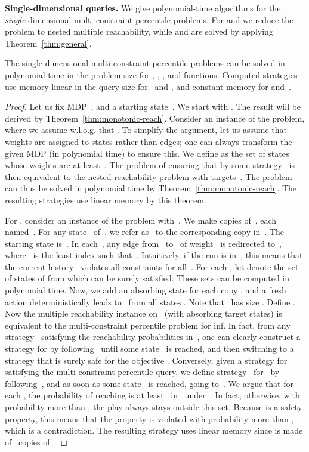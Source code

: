\documentclass{llncs}
\begin{document}
\smallskip\noindent\textbf{Single-dimensional queries.} We give polynomial-time algorithms for the \emph{single}-dimensional multi-cons\-traint percentile problems.
For  and  we reduce the problem to nested multiple reachability, while  and  are solved by applying Theorem~\ref{thm:general}. 

\begin{theorem}
\label{thm:quant_reg_single_dim}
  The single-dimensional multi-constraint percentile problems can be solved in polynomial time in the problem size
  for , , , and  functions. Computed strategies use memory linear in the query size for~ and ,
  and constant memory for  and~.
\end{theorem}
\begin{proof}
  Let us fix MDP~, and a starting state~. We start with . The result will be derived by Theorem~\ref{thm:monotonic-reach}.
  Consider an instance  of the problem, where we assume w.l.o.g. that .
  To simplify the argument, let us assume that weights are assigned to states rather than edges;
  one can always transform the given MDP (in polynomial time) to ensure this.
  We define  as the set of states whose weights are at least~. The problem
  of ensuring that  by some strategy~ 
  is then equivalent to the nested reachability problem with targets~.
  The problem can thus be solved in polynomial time by Theorem~\ref{thm:monotonic-reach}.
  The resulting strategies use linear memory by this theorem.

  For , consider an instance  of the problem with~.
  We make  copies of~, each named~. For any state~ of~, we refer as~ to the corresponding copy in~.
  The starting state is~.
  In each~, any edge from~ to~ 
  of weight~ is redirected to~, where~ is the least index such that~.
  Intuitively, if the run is in~, this means that the current history~ violates all constraints  for all~.  
  For each , let  denote the set of states of  from which  can be surely satisfied.
  These sets can be computed in polynomial time.
  Now, we add an absorbing state  for each copy , and a fresh action  deterministically leads to~ from all states .
  Note that~ has size . Define .
  Now the multiple reachability instance  on~ (with absorbing target states) is equivalent to 
  the multi-constraint percentile problem for inf. In fact, from any strategy~ satisfying the reachability probabilities in~, one can clearly construct
  a strategy for  by following~ until some state~ is reached, and then switching to a strategy that is surely safe for the objective .
  Conversely, given a strategy  for~ satisfying the multi-constraint percentile query, we define strategy~ for~ by following~, and as soon as
  some state~ is reached, going to~. We argue that for each , the probability of reaching  is at least~
  in~ under~.
  In fact, otherwise, with probability more than , the play always stays outside this set. Because  is a safety property, this means that 
  the property is violated with probability more than , which is a contradiction.
  The resulting strategy uses linear memory since  is made of~ copies of~.


\end{proof}
\end{document}
